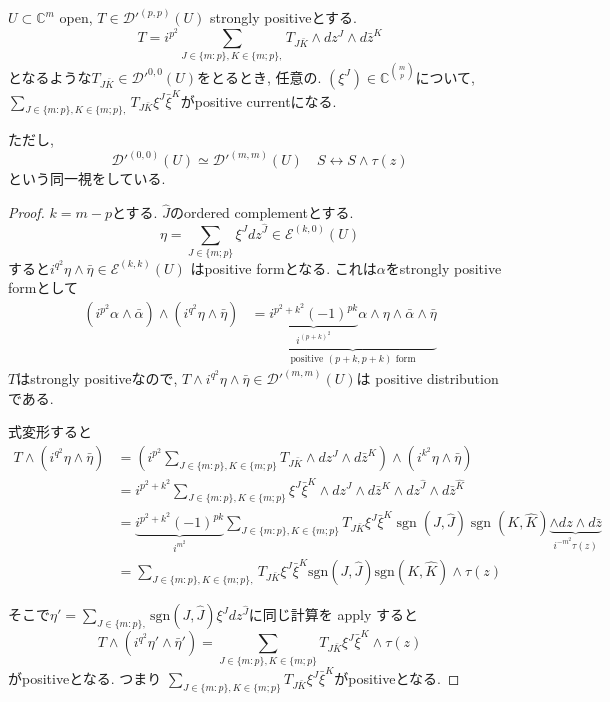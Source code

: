 \begin{tcolorbox}[mybox]
\begin{prop}
\label{prop-M-8.4.1}
 $U \subset \mathbb{C}^m$ open, $T \in \mathcal{D}'^{(p,p)}(U)$ strongly positiveとする. 
\begin{equation*}
T = i^{p^2} \sum_{J \in \{m : p\},  K\in \{m ; p\}, } 
T_{J\bar K} \wedge dz^J \wedge d\bar z^K
\end{equation*}
となるような$T_{J\bar K} \in \mathcal{D}'^{0, 0}(U)$をとるとき, 任意の.
$ (\xi^J) \in \mathbb{C}^{\binom{m}{p}}$について, 
$\sum_{J \in \{m : p\},  K\in \{m ; p\}, }  T_{J\bar K}\xi^J\bar{\xi}^K$がpositive currentになる. 
\end{prop}
\end{tcolorbox}
ただし, 
\begin{equation*}
\mathcal{D}'^{(0,0)}(U) \simeq \mathcal{D}'^{(m,m)}(U) 
\quad
S \longleftrightarrow S \wedge \tau(z)
\end{equation*}
という同一視をしている. 
\begin{proof}
$k =m-p$とする. $\hat{J}$のordered complementとする. 
$$
\eta = \sum_{J \in \{ m ; p \}} \xi^J dz^{\hat{J}}
\in \mathcal{E}^{(k, 0)}(U)
$$
すると$i^{q^2}\eta \wedge \bar{\eta} \in \mathcal{E}^{(k,k)}(U)$
はpositive formとなる. 
これは$\alpha$をstrongly positive formとして
\begin{align*}
\left( i^{p^2}\alpha \wedge \bar{\alpha} \right) \wedge \left( i^{q^2}\eta \wedge \bar{\eta} \right)
&= \underbrace{
\underbrace{i^{p^2+k^2}(-1)^{pk}}_{i^{(p+k)^2}} \alpha \wedge \eta \wedge \bar{\alpha} \wedge \bar{\eta}
}_{\text{positive $(p+k,p+k)$ form}}
\end{align*}
$T$はstrongly positiveなので, 
$T \wedge i^{q^2}\eta \wedge \bar{\eta} \in \mathcal{D}'^{(m,m)}(U)$は positive  distributionである. 

式変形すると
\begin{align*}
T\wedge\left(i^{q^2}\eta\wedge\bar{\eta}\right)
&=\left(i^{p^2}
\sum_{J \in \{m : p\},  K\in \{m ; p\}} 
T_{J\bar K}\wedge dz^J\wedge d\bar z^K\right)\wedge\left(i^{k^2}\eta\wedge\bar{\eta}\right) \\
&= i^{p^2+k^2}\sum_{J \in \{m : p\},  K\in \{m ; p\}} \xi^J\bar{\xi}^K \wedge dz^J\wedge d\bar z^K\wedge dz^{\hat J}\wedge d\bar z^{\hat K} \\
&= \underbrace{i^{p^2+k^2}(-1)^{pk}}_{i^{m^2}}
\sum_{J \in \{m : p\},  K\in \{m ; p\} }  T_{J\bar K}\xi^J\bar{\xi}^K \operatorname{sgn}(J,\hat J)\operatorname{sgn}(K,\hat K)\underbrace{\wedge dz\wedge d\bar z}_{i^{-m^2} \tau(z)}\\
&=
\sum_{J \in \{m : p\},  K\in \{m ; p\}, }T_{J\bar K}\xi^J\bar{\xi}^K \mathrm{sgn}(J,\hat J)\mathrm{sgn}(K,\hat K)\wedge \tau(z)
\end{align*}

そこで$\eta' =\sum_{J \in \{m : p\}, }\mathrm{sgn}(J,\hat J)\xi^J dz^{\hat J}$に同じ計算を apply すると
\begin{equation*}
T \wedge \left(i^{q^2}\eta' \wedge \bar{\eta}'\right)
= \sum_{J \in \{m : p\},  K\in \{m ; p\} }  T_{J\bar K}\xi^J\bar{\xi}^K \wedge \tau(z)
\end{equation*}
がpositiveとなる. つまり
$\sum_{J \in \{m : p\},  K\in \{m ; p\} } T_{J\bar K}\xi^J\bar{\xi}^K$がpositiveとなる.
\end{proof}
